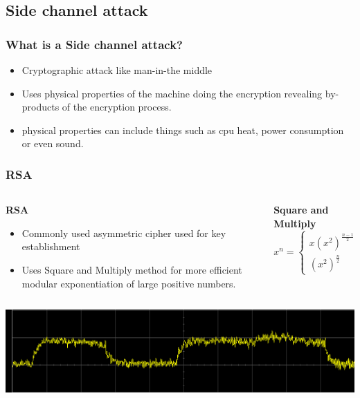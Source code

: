 \documentclass{beamer}
\begin{document}
	\subsection{Side channel attack}
		\begin{frame}
		\frametitle{What is a Side channel attack?}
			\begin{itemize}
			\item Cryptographic attack like man-in-the middle\\
			\item Uses physical properties of the machine doing the encryption revealing by-products of the encryption process.  \\
			\item physical properties can include things such as cpu heat, power consumption or even sound.
		\end{itemize}
		\end{frame}
		\begin{frame}
		\frametitle{RSA}
		\begin{columns}[c]
		\begin{column}{.45\textwidth}
		\textbf{RSA}
		 \begin{itemize}
		 \item Commonly used asymmetric cipher used for key establishment
		 \item Uses Square and Multiply method for more efficient modular exponentiation of large positive numbers.
			\end{itemize}
		 \end{column}
		 
		 \begin{column}{.45\textwidth}
		 \textbf{Square and Multiply}
		 \[x^n = \left\{
  \begin{array}{lr}
    x(x^2)^{\frac{n-1}{2}} &  \text{: if n is odd} \\
    (x^2)^{\frac{n}{2}} & \text{: if n is even}
  \end{array}
\right.
\]
		 \end{column}
		 \end{columns}
		\end{frame}
		\begin{frame}
		  \includegraphics[width= \textwidth]{Images/Power_attack.png} 
		\end{frame}
\end{document}
